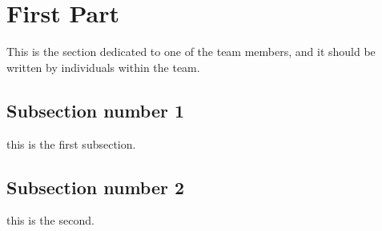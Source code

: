 \documentclass[../main/main.tex]{subfiles}
\begin{document}
\section{First Part}
This is the section dedicated to one of the team members, and it should be written by individuals within the team. 

\subsection{Subsection number 1}
this is the first subsection.

\subsection{Subsection number 2}
this is the second.
\end{document}
